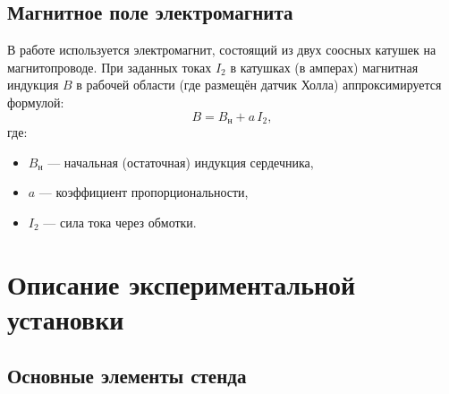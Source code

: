 \documentclass[12pt,a4paper]{article}
\begin{document}
\subsection{Магнитное поле электромагнита}

В работе используется электромагнит, состоящий из двух соосных катушек на магнитопроводе. При заданных токах $I_2$ в катушках (в амперах) магнитная индукция $B$ в рабочей области (где размещён датчик Холла) аппроксимируется формулой:
\[
    B = B_{\text{н}} + a\,I_2,
\]
где:
\begin{itemize}
    \item $B_{\text{н}}$ --- начальная (остаточная) индукция сердечника,
    \item $a$ --- коэффициент пропорциональности,
    \item $I_2$ --- сила тока через обмотки.
\end{itemize}

\section{Описание экспериментальной установки}

\subsection{Основные элементы стенда}
\end{document}
